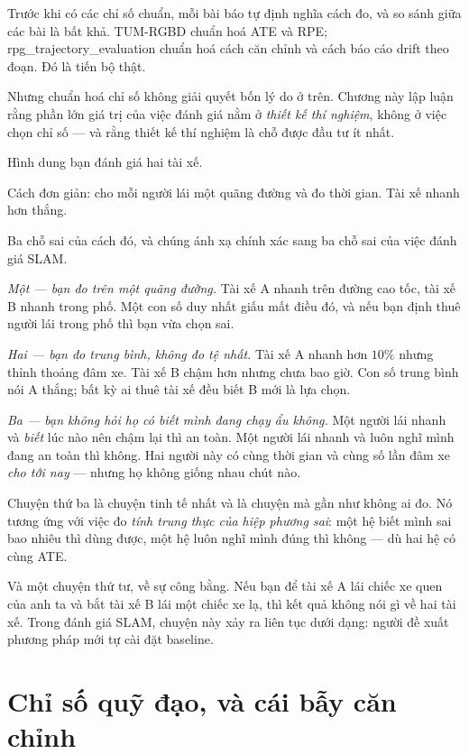 \documentclass[../../vslam.tex]{subfiles}
\begin{document}
Trước khi có các chỉ số chuẩn, mỗi bài báo tự định nghĩa cách đo, và so sánh giữa các bài là bất khả. TUM-RGBD \cite{sturm2012tumrgbd} chuẩn hoá ATE và RPE; rpg\_trajectory\_evaluation \cite{zhang2018trajeval} chuẩn hoá cách căn chỉnh và cách báo cáo drift theo đoạn. Đó là tiến bộ thật.

Nhưng chuẩn hoá chỉ số không giải quyết bốn lý do ở trên. Chương này lập luận rằng phần lớn giá trị của việc đánh giá nằm ở \emph{thiết kế thí nghiệm}, không ở việc chọn chỉ số --- và rằng thiết kế thí nghiệm là chỗ được đầu tư ít nhất.

\begin{trucgiac}
Hình dung bạn đánh giá hai tài xế.

Cách đơn giản: cho mỗi người lái một quãng đường và đo thời gian. Tài xế nhanh hơn thắng.

Ba chỗ sai của cách đó, và chúng ánh xạ chính xác sang ba chỗ sai của việc đánh giá SLAM.

\emph{Một --- bạn đo trên một quãng đường.} Tài xế A nhanh trên đường cao tốc, tài xế B nhanh trong phố. Một con số duy nhất giấu mất điều đó, và nếu bạn định thuê người lái trong phố thì bạn vừa chọn sai.

\emph{Hai --- bạn đo trung bình, không đo tệ nhất.} Tài xế A nhanh hơn \(10\%\) nhưng thỉnh thoảng đâm xe. Tài xế B chậm hơn nhưng chưa bao giờ. Con số trung bình nói A thắng; bất kỳ ai thuê tài xế đều biết B mới là lựa chọn.

\emph{Ba --- bạn không hỏi họ có biết mình đang chạy ẩu không.} Một người lái nhanh và \emph{biết} lúc nào nên chậm lại thì an toàn. Một người lái nhanh và luôn nghĩ mình đang an toàn thì không. Hai người này có cùng thời gian và cùng số lần đâm xe \emph{cho tới nay} --- nhưng họ không giống nhau chút nào.

Chuyện thứ ba là chuyện tinh tế nhất và là chuyện mà gần như không ai đo. Nó tương ứng với việc đo \emph{tính trung thực của hiệp phương sai}: một hệ biết mình sai bao nhiêu thì dùng được, một hệ luôn nghĩ mình đúng thì không --- dù hai hệ có cùng ATE.

Và một chuyện thứ tư, về sự công bằng. Nếu bạn để tài xế A lái chiếc xe quen của anh ta và bắt tài xế B lái một chiếc xe lạ, thì kết quả không nói gì về hai tài xế. Trong đánh giá SLAM, chuyện này xảy ra liên tục dưới dạng: người đề xuất phương pháp mới tự cài đặt baseline.
\end{trucgiac}

\section{Chỉ số quỹ đạo, và cái bẫy căn chỉnh}
\end{document}
